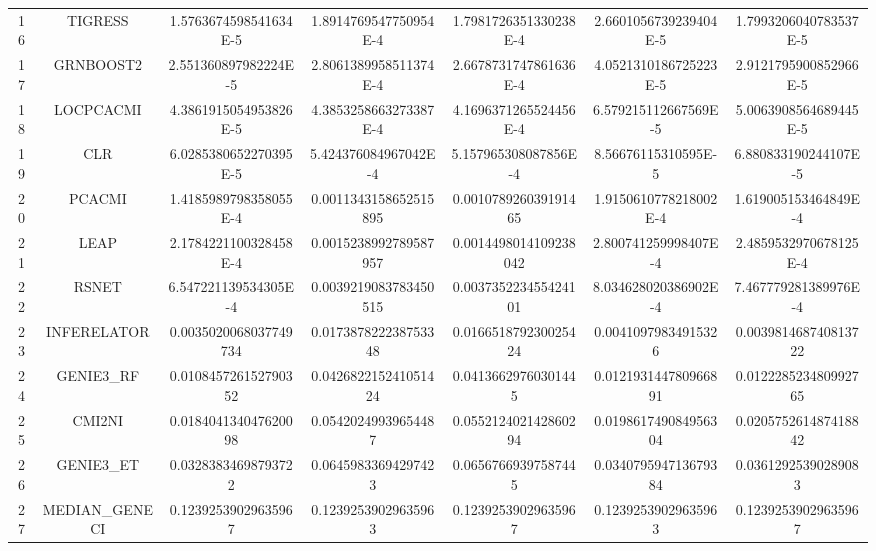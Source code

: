 \documentclass[a4paper,10pt]{article}
\begin{document}
\begin{landscape}
\begin{table}[!htp]
\begin{tabular}{ccccccc}
16&TIGRESS&1.5763674598541634E-5&1.8914769547750954E-4&1.7981726351330238E-4&2.6601056739239404E-5&1.7993206040783537E-5\\
17&GRNBOOST2&2.551360897982224E-5&2.8061389958511374E-4&2.6678731747861636E-4&4.0521310186725223E-5&2.9121795900852966E-5\\
18&LOCPCACMI&4.3861915054953826E-5&4.3853258663273387E-4&4.1696371265524456E-4&6.579215112667569E-5&5.0063908564689445E-5\\
19&CLR&6.0285380652270395E-5&5.424376084967042E-4&5.157965308087856E-4&8.56676115310595E-5&6.880833190244107E-5\\
20&PCACMI&1.4185989798358055E-4&0.0011343158652515895&0.001078926039191465&1.9150610778218002E-4&1.619005153464849E-4\\
21&LEAP&2.1784221100328458E-4&0.0015238992789587957&0.0014498014109238042&2.800741259998407E-4&2.4859532970678125E-4\\
22&RSNET&6.547221139534305E-4&0.0039219083783450515&0.003735223455424101&8.034628020386902E-4&7.467779281389976E-4\\
23&INFERELATOR&0.0035020068037749734&0.017387822238753348&0.016651879230025424&0.00410979834915326&0.003981468740813722\\
24&GENIE3_RF&0.010845726152790352&0.042682215241051424&0.04136629760301445&0.012193144780966891&0.012228523480992765\\
25&CMI2NI&0.018404134047620098&0.05420249939654487&0.055212402142860294&0.019861749084956304&0.020575261487418842\\
26&GENIE3_ET&0.03283834698793722&0.06459833694297423&0.06567669397587445&0.034079594713679384&0.03612925390289083\\
27&MEDIAN_GENECI&0.12392539029635967&0.12392539029635963&0.12392539029635967&0.12392539029635963&0.12392539029635967\\
\hline
\end{tabular}
\end{table}


\newpage


\end{landscape}
\end{document}
